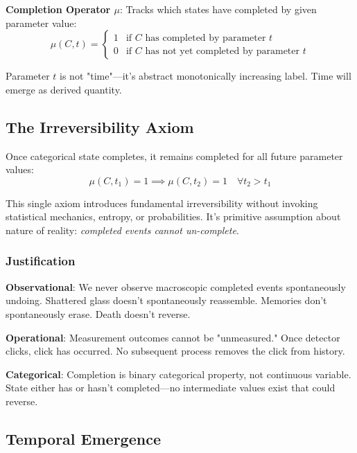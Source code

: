 \documentclass[11pt,onecolumn]{article}
\begin{document}
\textbf{Completion Operator $\mu$}: Tracks which states have completed by given parameter value:
\begin{equation}
\mu(C, t) = \begin{cases}
1 & \text{if } C \text{ has completed by parameter } t \\
0 & \text{if } C \text{ has not yet completed by parameter } t
\end{cases}
\end{equation}

Parameter $t$ is not "time"---it's abstract monotonically increasing label. Time will emerge as derived quantity.

\subsection{The Irreversibility Axiom}

\begin{axiom}
\label{axiom:irreversibility}
Once categorical state completes, it remains completed for all future parameter values:
\begin{equation}
\mu(C, t_1) = 1 \implies \mu(C, t_2) = 1 \quad \forall t_2 > t_1
\end{equation}
\end{axiom}

This single axiom introduces fundamental irreversibility without invoking statistical mechanics, entropy, or probabilities. It's primitive assumption about nature of reality: \textit{completed events cannot un-complete}.

\subsubsection{Justification}

\textbf{Observational}: We never observe macroscopic completed events spontaneously undoing. Shattered glass doesn't spontaneously reassemble. Memories don't spontaneously erase. Death doesn't reverse.

\textbf{Operational}: Measurement outcomes cannot be "unmeasured." Once detector clicks, click has occurred. No subsequent process removes the click from history.

\textbf{Categorical}: Completion is binary categorical property, not continuous variable. State either has or hasn't completed---no intermediate values exist that could reverse.

\subsection{Temporal Emergence}
\end{document}
